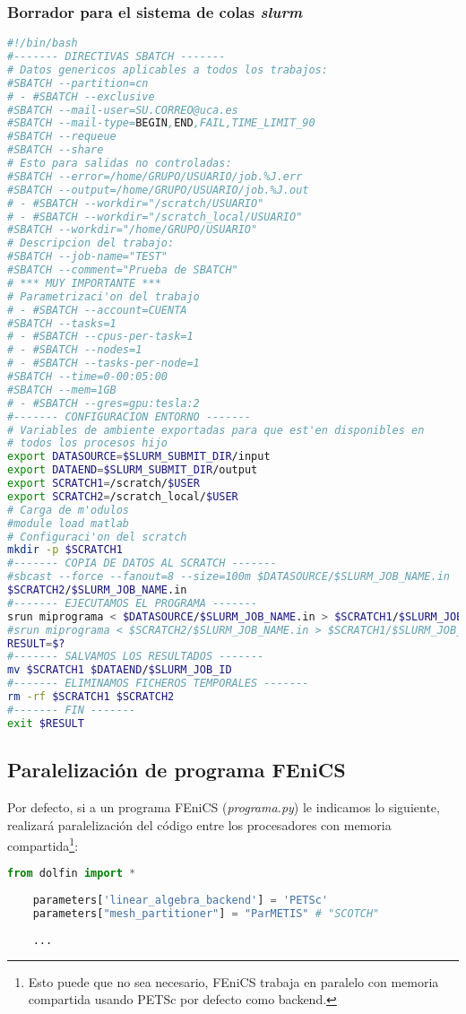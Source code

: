 \subsubsection*{Borrador para el sistema de colas \textit{slurm}}
    \begin{lstlisting}[language=sh]
#!/bin/bash
#------- DIRECTIVAS SBATCH -------
# Datos genericos aplicables a todos los trabajos:
#SBATCH --partition=cn
# - #SBATCH --exclusive
#SBATCH --mail-user=SU.CORREO@uca.es
#SBATCH --mail-type=BEGIN,END,FAIL,TIME_LIMIT_90
#SBATCH --requeue
#SBATCH --share
# Esto para salidas no controladas:
#SBATCH --error=/home/GRUPO/USUARIO/job.%J.err
#SBATCH --output=/home/GRUPO/USUARIO/job.%J.out
# - #SBATCH --workdir="/scratch/USUARIO"
# - #SBATCH --workdir="/scratch_local/USUARIO"
#SBATCH --workdir="/home/GRUPO/USUARIO"
# Descripcion del trabajo:
#SBATCH --job-name="TEST"
#SBATCH --comment="Prueba de SBATCH"
# *** MUY IMPORTANTE ***
# Parametrizaci'on del trabajo
# - #SBATCH --account=CUENTA
#SBATCH --tasks=1
# - #SBATCH --cpus-per-task=1
# - #SBATCH --nodes=1
# - #SBATCH --tasks-per-node=1
#SBATCH --time=0-00:05:00
#SBATCH --mem=1GB
# - #SBATCH --gres=gpu:tesla:2
#------- CONFIGURACION ENTORNO -------
# Variables de ambiente exportadas para que est'en disponibles en
# todos los procesos hijo
export DATASOURCE=$SLURM_SUBMIT_DIR/input
export DATAEND=$SLURM_SUBMIT_DIR/output
export SCRATCH1=/scratch/$USER
export SCRATCH2=/scratch_local/$USER
# Carga de m'odulos
#module load matlab
# Configuraci'on del scratch
mkdir -p $SCRATCH1
#------- COPIA DE DATOS AL SCRATCH -------
#sbcast --force --fanout=8 --size=100m $DATASOURCE/$SLURM_JOB_NAME.in
$SCRATCH2/$SLURM_JOB_NAME.in
#------- EJECUTAMOS EL PROGRAMA -------
srun miprograma < $DATASOURCE/$SLURM_JOB_NAME.in > $SCRATCH1/$SLURM_JOB_NAME.out
#srun miprograma < $SCRATCH2/$SLURM_JOB_NAME.in > $SCRATCH1/$SLURM_JOB_NAME.out
RESULT=$?
#------- SALVAMOS LOS RESULTADOS -------
mv $SCRATCH1 $DATAEND/$SLURM_JOB_ID
#------- ELIMINAMOS FICHEROS TEMPORALES -------
rm -rf $SCRATCH1 $SCRATCH2
#------- FIN -------
exit $RESULT
\end{lstlisting}

\subsection*{Paralelización de programa FEniCS}

Por defecto, si a un programa FEniCS (\textit{programa.py}) le indicamos lo siguiente, realizará paralelización del código entre los procesadores con memoria compartida\footnote{Esto puede que no sea necesario, FEniCS trabaja en paralelo con memoria compartida usando PETSc por defecto como backend.}:
\begin{lstlisting}[language=python]
	from dolfin import *
	
	parameters['linear_algebra_backend'] = 'PETSc'
	parameters["mesh_partitioner"] = "ParMETIS" # "SCOTCH"
	
	...
\end{lstlisting}


